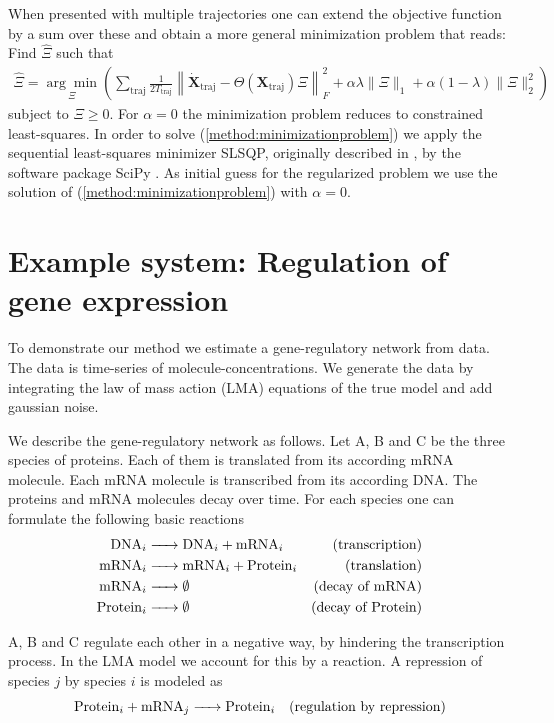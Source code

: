 \documentclass[oneside, abstracton, titlepage]{scrartcl}
\begin{document}
	When presented with multiple trajectories one can extend the objective function by a sum over these and obtain a more general minimization problem that reads: Find $\hat{\Xi}$ such that
	\begin{align}
		\hat{\Xi} = \underset{\Xi}{\arg\min}\left( \sum_{\text{traj}}\frac{1}{2T_{\text{traj}}}\left\| \dot{\textbf{X}}_\text{traj} - \Theta(\textbf{X}_\text{traj})\Xi \right\|_F^2 + \alpha\lambda\|\Xi\|_1 + \alpha(1-\lambda)\|\Xi\|_2^2 \right)
	\end{align}
	subject to $\Xi\geq 0$.
	For $\alpha=0$ the minimization problem reduces to constrained least-squares. In order to solve (\ref{method:minimizationproblem}) we apply the sequential least-squares minimizer SLSQP, originally described in \cite{Kraft1988}, by the software package SciPy \cite{SciPy}. As initial guess for the regularized problem we use the solution of (\ref{method:minimizationproblem}) with $\alpha=0$.

    \section{Example system: Regulation of gene expression}\label{sec:generegulation}

    To demonstrate our method we estimate a gene-regulatory network from data. The data is time-series of molecule-concentrations. We generate the data by integrating the law of mass action (LMA) equations of the true model and add gaussian noise.

    We describe the gene-regulatory network as follows. Let A, B and C be the three species of proteins. Each of them is translated from its according mRNA molecule. Each mRNA molecule is transcribed from its according DNA. The proteins and mRNA molecules decay over time. For each species one can formulate the following basic reactions
    \begin{align*}
        \ce{ DNA_i } & \ce{ -> DNA_i + mRNA_i } &\text{(transcription)} \\
        \ce{ mRNA_i } & \ce{ -> mRNA_i + Protein_i } &\text{(translation)} \\
        \ce{ mRNA_i } & \ce{ -> } \emptyset &\text{(decay of mRNA)} \\
        \ce{ Protein_i } & \ce{ -> } \emptyset &\text{(decay of Protein)}
    \end{align*}

    A, B and C regulate each other in a negative way, by hindering the transcription process. In the LMA model we account for this by a reaction. A repression of species $j$ by species $i$ is modeled as
    \begin{equation*}
        \ce{ Protein_i + mRNA_j -> Protein_i } \quad \text{(regulation by repression)}
    \end{equation*}
\end{document}
